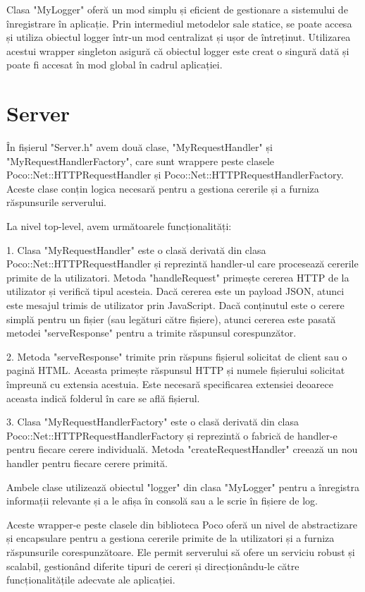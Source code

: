 Clasa "MyLogger" oferă un mod simplu și eficient de gestionare a sistemului de înregistrare în aplicație. Prin intermediul metodelor sale statice, se poate accesa și utiliza obiectul logger într-un mod centralizat și ușor de întreținut. Utilizarea acestui wrapper singleton asigură că obiectul logger este creat o singură dată și poate fi accesat în mod global în cadrul aplicației.

\section{Server}

În fișierul "Server.h" avem două clase, "MyRequestHandler" și "MyRequestHandlerFactory", care sunt wrappere peste clasele Poco::Net::HTTPRequestHandler și Poco::Net::HTTPRequestHandlerFactory. Aceste clase conțin logica necesară pentru a gestiona cererile și a furniza răspunsurile serverului.

La nivel top-level, avem următoarele funcționalități:

1. Clasa "MyRequestHandler" este o clasă derivată din clasa Poco::Net::HTTPRequestHandler și reprezintă handler-ul care procesează cererile primite de la utilizatori. Metoda "handleRequest" primește cererea HTTP de la utilizator și verifică tipul acesteia. Dacă cererea este un payload JSON, atunci este mesajul trimis de utilizator prin JavaScript. Dacă conținutul este o cerere simplă pentru un fișier (sau legături către fișiere), atunci cererea este pasată metodei "serveResponse" pentru a trimite răspunsul corespunzător.

2. Metoda "serveResponse" trimite prin răspuns fișierul solicitat de client sau o pagină HTML. Aceasta primește răspunsul HTTP și numele fișierului solicitat împreună cu extensia acestuia. Este necesară specificarea extensiei deoarece aceasta indică folderul în care se află fișierul.

3. Clasa "MyRequestHandlerFactory" este o clasă derivată din clasa Poco::Net::HTTPRequestHandlerFactory și reprezintă o fabrică de handler-e pentru fiecare cerere individuală. Metoda "createRequestHandler" creează un nou handler pentru fiecare cerere primită.

Ambele clase utilizează obiectul "logger" din clasa "MyLogger" pentru a înregistra informații relevante și a le afișa în consolă sau a le scrie în fișiere de log.

Aceste wrapper-e peste clasele din biblioteca Poco oferă un nivel de abstractizare și encapsulare pentru a gestiona cererile primite de la utilizatori și a furniza răspunsurile corespunzătoare. Ele permit serverului să ofere un serviciu robust și scalabil, gestionând diferite tipuri de cereri și direcționându-le către funcționalitățile adecvate ale aplicației.